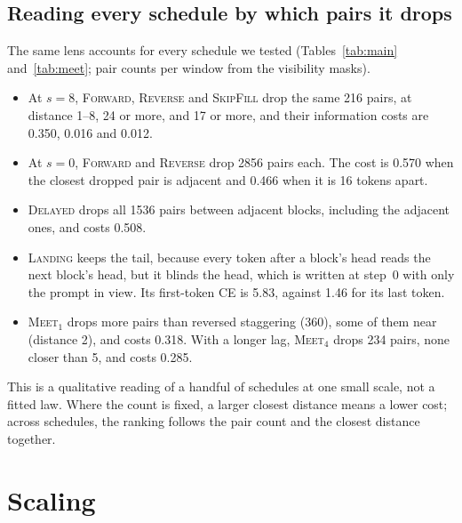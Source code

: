 \documentclass{article}
\theoremstyle{definition}
\theoremstyle{remark}
\newcommand{\name}[1]{\textup{\textsc{#1}}}
\newcommand{\sfill}{\name{SkipFill}\xspace}
\newcommand{\rev}{\name{Reverse}\xspace}
\newcommand{\fwd}{\name{Forward}\xspace}
\newcommand{\delayed}{\name{Delayed}\xspace}
\newcommand{\landing}{\name{Landing}\xspace}
\newcommand{\meet}[1]{\name{Meet}$_{#1}$}
\begin{document}
\subsection{Reading every schedule by which pairs it drops}
\label{sec:lens}

The same lens accounts for every schedule we tested (Tables~\ref{tab:main} and~\ref{tab:meet}; pair counts per window from the visibility masks).
\begin{itemize}
  \item At $s=8$, \fwd, \rev and \sfill drop the same 216 pairs, at distance 1--8, 24 or more, and 17 or more, and their information costs are 0.350, 0.016 and 0.012.
  \item At $s=0$, \fwd and \rev drop 2856 pairs each. The cost is 0.570 when the closest dropped pair is adjacent and 0.466 when it is 16 tokens apart.
  \item \delayed drops all 1536 pairs between adjacent blocks, including the adjacent ones, and costs 0.508.
  \item \landing keeps the tail, because every token after a block's head reads the next block's head, but it blinds the head, which is written at step~0 with only the prompt in view. Its first-token CE is 5.83, against 1.46 for its last token.
  \item \meet{1} drops more pairs than reversed staggering (360), some of them near (distance 2), and costs 0.318. With a longer lag, \meet{4} drops 234 pairs, none closer than 5, and costs 0.285.
\end{itemize}
This is a qualitative reading of a handful of schedules at one small scale, not a fitted law.
Where the count is fixed, a larger closest distance means a lower cost; across schedules, the ranking follows the pair count and the closest distance together.

\section{Scaling}
\label{app:scaling}
\end{document}
